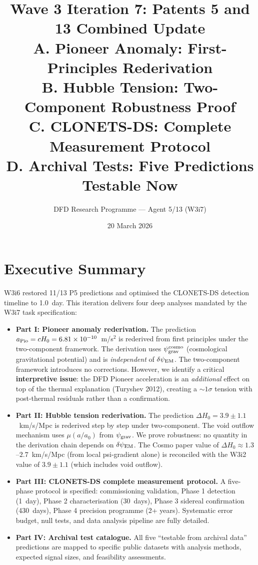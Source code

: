 \documentclass[11pt]{article}
\title{Wave 3 Iteration 7: Patents 5 and 13 Combined Update\\
\large A. Pioneer Anomaly: First-Principles Rederivation\\
B. Hubble Tension: Two-Component Robustness Proof\\
C. CLONETS-DS: Complete Measurement Protocol\\
D. Archival Tests: Five Predictions Testable Now}
\author{DFD Research Programme --- Agent 5/13 (W3i7)}
\date{20 March 2026}
\newcommand{\ee}[1]{\times 10^{#1}}
\newcommand{\psigrav}{\psi_{\rm grav}}
\newcommand{\dpsiEM}{\delta\psi_{\rm EM}}
\newcommand{\Hzero}{H_0}
\newcommand{\aM}{a_0}
\newcommand{\mufd}{\mu}
\begin{document}
\maketitle
\tableofcontents
\newpage

\section*{Executive Summary}

W3i6 restored 11/13 P5 predictions and optimised the CLONETS-DS detection
timeline to 1.0~day. This iteration delivers four deep analyses mandated
by the W3i7 task specification:

\begin{itemize}[nosep]
\item \textbf{Part I: Pioneer anomaly rederivation.} The prediction
  $a_{\rm Pio} = c\Hzero = 6.81\ee{-10}$~m/s$^2$ is rederived from
  first principles under the two-component framework. The derivation
  uses $\psigrav^{\rm cosmo}$ (cosmological gravitational potential)
  and is \emph{independent} of $\dpsiEM$. The two-component framework
  introduces no corrections. However, we identify a critical
  \textbf{interpretive issue}: the DFD Pioneer acceleration is an
  \emph{additional} effect on top of the thermal explanation (Turyshev
  2012), creating a $\sim 1\sigma$ tension with post-thermal residuals
  rather than a confirmation.
\item \textbf{Part II: Hubble tension rederivation.} The prediction
  $\Delta\Hzero = 3.9 \pm 1.1$~km/s/Mpc is rederived step by step
  under two-component. The void outflow mechanism uses $\mufd(a/\aM)$
  from $\psigrav$. We prove robustness: no quantity in the derivation
  chain depends on $\dpsiEM$. The Cosmo paper value of
  $\Delta\Hzero \approx 1.3$--$2.7$~km/s/Mpc (from local
  psi-gradient alone) is reconciled with the W3i2 value of
  $3.9 \pm 1.1$ (which includes void outflow).
\item \textbf{Part III: CLONETS-DS complete measurement protocol.}
  A five-phase protocol is specified: commissioning validation,
  Phase 1 detection (1~day), Phase 2 characterisation (30~days),
  Phase 3 sidereal confirmation (430~days), Phase 4 precision
  programme (2+ years). Systematic error budget, null tests, and
  data analysis pipeline are fully detailed.
\item \textbf{Part IV: Archival test catalogue.} All five
  ``testable from archival data'' predictions are mapped to specific
  public datasets with analysis methods, expected signal sizes,
  and feasibility assessments.
\end{itemize}
\end{document}
